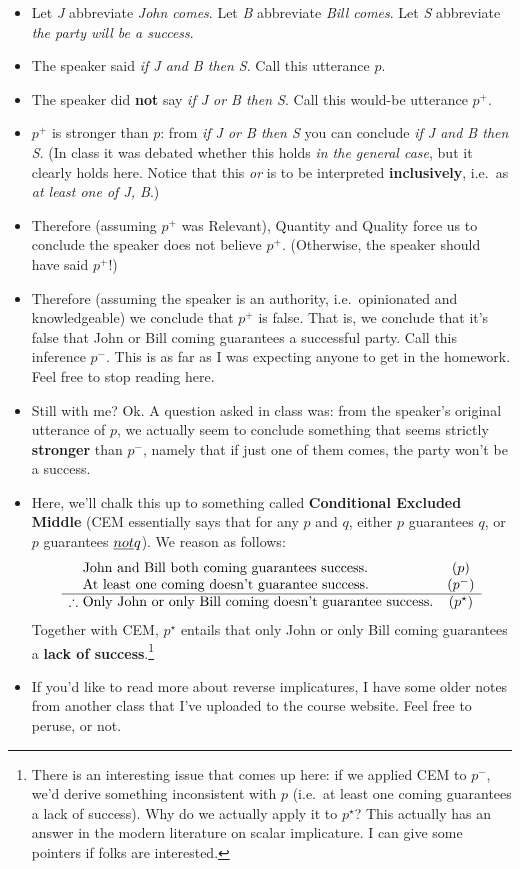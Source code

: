 \begin{itemize}
\item
  Let \emph{J} abbreviate \emph{John comes}. Let \emph{B} abbreviate
  \emph{Bill comes}. Let \emph{S} abbreviate \emph{the party will be a
  success}.
\item
  The speaker said \emph{if J and B then S}. Call this utterance $p$.
\item
  The speaker did \textbf{not} say \emph{if J or B then S}. Call this would-be
  utterance $p^+$.
\item
  $p^+$ is stronger than $p$: from \emph{if J or B then S} you can
  conclude \emph{if J and B then S}. (In class it was debated whether this holds
  \emph{in the general case}, but it clearly holds here. Notice that this
  \emph{or} is to be interpreted \textbf{inclusively}, i.e.~as \emph{at least
  one of J, B}.)
\item
  Therefore (assuming $p^+$ was Relevant), Quantity and
  Quality force us to conclude the speaker does not believe $p^+$.
  (Otherwise, the speaker should have said $p^+$!)
\item
  Therefore (assuming the speaker is an authority, i.e.~opinionated and
  knowledgeable) we conclude that $p^+$ is false. That is, we conclude that
  it's false that John or Bill coming guarantees a successful party. Call this
  inference $p^-$. This is as far as I was expecting anyone to get in the
  homework. Feel free to stop reading here.
\item
  Still with me? Ok. A question asked in class was: from the speaker's
  original utterance of $p$, we actually seem to conclude something that
  seems strictly \textbf{stronger} than $p^-$, namely that if just one of them
  comes, the party won't be a success.
\item
  Here, we'll chalk this up to something called \textbf{Conditional Excluded
  Middle} (CEM essentially says that for any $p$ and $q$, either $p$ guarantees
  $q$, or $p$ guarantees $\emph{not }q$). We reason as follows:
  	\[
	\begin{array}{l@{}lc}
		&\text{John and Bill both coming guarantees success.} & (p)
		\\
		&\text{At least one coming doesn't guarantee success.} & (p^-)
		\\\hline
		\therefore~&\text{Only John or only Bill coming doesn't guarantee success.} & (p^{\star})%
	\end{array}
	\]
\noindent Together with CEM, $p^{\star}$ entails that only John or only Bill coming guarantees a \textbf{lack of success}.\footnote{There is an interesting issue that comes up here: if we applied CEM to $p^-$, we'd derive something inconsistent with $p$ (i.e.~at least one coming guarantees a lack of success). Why do we actually apply it to $p^{\star}$? This actually has an answer in the modern literature on scalar implicature. I can give some pointers if folks are interested.}%
\item
  If you'd like to read more about reverse implicatures, I have some
  older notes from another class that I've uploaded to the course
  website. Feel free to peruse, or not.
\end{itemize}



